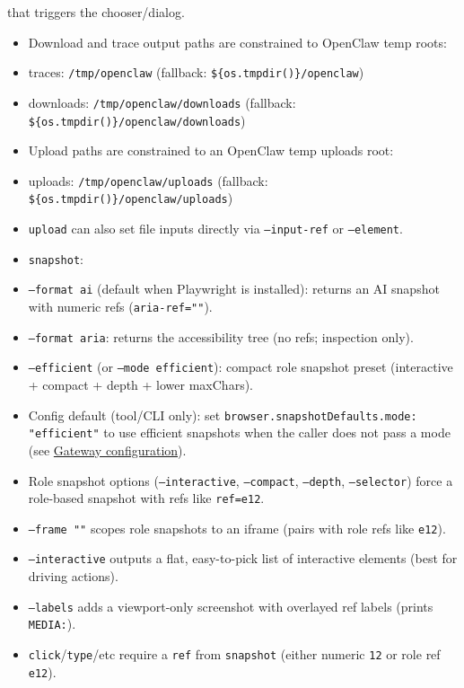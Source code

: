 that triggers the chooser/dialog.
\begin{itemize}
  \item Download and trace output paths are constrained to OpenClaw temp roots:
  \item traces: \texttt{/tmp/openclaw} (fallback: \texttt{\$\{os.tmpdir()\}/openclaw})
  \item downloads: \texttt{/tmp/openclaw/downloads} (fallback: \texttt{\$\{os.tmpdir()\}/openclaw/downloads})
  \item Upload paths are constrained to an OpenClaw temp uploads root:
  \item uploads: \texttt{/tmp/openclaw/uploads} (fallback: \texttt{\$\{os.tmpdir()\}/openclaw/uploads})
  \item \texttt{upload} can also set file inputs directly via \texttt{--input-ref} or \texttt{--element}.
  \item \texttt{snapshot}:
  \item \texttt{--format ai} (default when Playwright is installed): returns an AI snapshot with numeric refs (\texttt{aria-ref=""}).
  \item \texttt{--format aria}: returns the accessibility tree (no refs; inspection only).
  \item \texttt{--efficient} (or \texttt{--mode efficient}): compact role snapshot preset (interactive + compact + depth + lower maxChars).
  \item Config default (tool/CLI only): set \texttt{browser.snapshotDefaults.mode: "efficient"} to use efficient snapshots when the caller does not pass a mode (see \href{/gateway/configuration\#browser-openclaw-managed-browser}{Gateway configuration}).
  \item Role snapshot options (\texttt{--interactive}, \texttt{--compact}, \texttt{--depth}, \texttt{--selector}) force a role-based snapshot with refs like \texttt{ref=e12}.
  \item \texttt{--frame ""} scopes role snapshots to an iframe (pairs with role refs like \texttt{e12}).
  \item \texttt{--interactive} outputs a flat, easy-to-pick list of interactive elements (best for driving actions).
  \item \texttt{--labels} adds a viewport-only screenshot with overlayed ref labels (prints \texttt{MEDIA:}).
  \item \texttt{click}/\texttt{type}/etc require a \texttt{ref} from \texttt{snapshot} (either numeric \texttt{12} or role ref \texttt{e12}).
\end{itemize}

